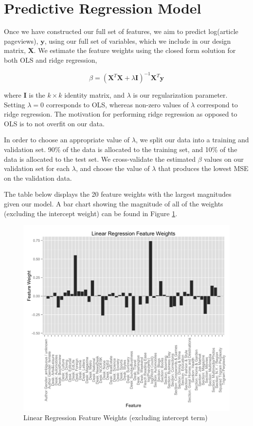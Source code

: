 \documentclass[fleqn,12pt]{SelfArx} %
\begin{document}
\section{Predictive Regression Model}

Once we have constructed our full set of features, we aim to predict log(article pageviews), $\mathbf{y}$, using our full set of variables, which we include in our design matrix, $\mathbf{X}$. We estimate the feature weights using the closed form solution for both OLS and ridge regression,

\begin{center}
\begin{equation}
\beta = (\mathbf{X}^T\mathbf{X} + \lambda \mathbf{I})^{-1}\mathbf{X}^T\mathbf{y}
\end{equation}
\end{center}

\noindent where $\mathbf{I}$ is the $k \times k$ identity matrix, and $\lambda$ is our regularization parameter. Setting $\lambda = 0$ corresponds to OLS, whereas non-zero values of $\lambda$ correspond to ridge regression. The motivation for performing ridge regression as opposed to OLS is to not overfit on our data. 

In order to choose an appropriate value of $\lambda$, we split our data into a training and validation set. 90\% of the data is allocated to the training set, and 10\% of the data is allocated to the test set. We cross-validate the estimated $\beta$ values on our validation set for each $\lambda$, and choose the value of $\lambda$ that produces the lowest MSE on the validation data.

The table below displays the 20 feature weights with the largest magnitudes given our model. A bar chart showing the magnitude of all of the weights (excluding the intercept weight) can be found in Figure \ref{fig:lin_reg_weights}.

\begin{figure}[ht]\centering
\includegraphics[width=\linewidth]{feature_weights.png}
\caption{Linear Regression Feature Weights (excluding intercept term)}
\label{fig:lin_reg_weights}
\end{figure}
\end{document}
